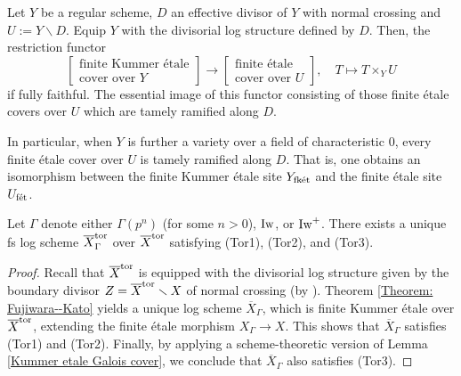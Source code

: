 \begin{Theorem}\label{Theorem: Fujiwara--Kato}
Let $Y$ be a regular scheme, $D$ an effective divisor of $Y$ with normal crossing and $U := Y \smallsetminus D$. Equip $Y$ with the divisorial log structure defined by $D$. Then, the restriction functor \[
    \left[\begin{array}{c}
        \text{finite Kummer \'etale}  \\
        \text{cover over $Y$} 
    \end{array}\right] \rightarrow \left[\begin{array}{c}
        \text{finite \'etale}  \\
         \text{cover over $U$}
    \end{array}\right], \quad T \mapsto T\times_Y U
\] if fully faithful. The essential image of this functor consisting of those finite \'etale covers over $U$ which are tamely ramified along $D$.
\end{Theorem}

In particular, when $Y$ is further a variety over a field of characteristic $0$, every finite \'etale cover over $U$ is tamely ramified along $D$. That is, one obtains an isomorphism between the finite Kummer \'etale site $Y_{\operatorname{\textrm{fk\'{e}t}}}$ and the finite \'etale site $U_{\operatorname{\textrm{f\'{e}t}}}$.

\begin{Proposition}\label{Proposition: toridal compactification of algebraic Siegel varieties}
Let $\Gamma$ denote either $\Gamma(p^n)$ (for some $n>0$), $\operatorname{Iw}$, or $\operatorname{Iw}^+$. There exists a unique fs log scheme $\overline{X}^{\operatorname{tor}}_{\Gamma}$ over $\overline{X}^{\operatorname{tor}}$ satisfying (Tor1),  (Tor2), and (Tor3).
\end{Proposition}
\begin{proof}
Recall that $\overline{X}^{\operatorname{tor}}$ is equipped with the divisorial log structure given by the boundary divisor 
$Z = \overline{X}^{\operatorname{tor}}\smallsetminus X$ of normal crossing (by \cite[Chapter IV, Theorem 6.7 (1)]{Faltings-Chai}). Theorem \ref{Theorem: Fujiwara--Kato} yields a unique log scheme $\overline{X}_{\Gamma}$, which is finite Kummer \'etale over $\overline{X}^{\operatorname{tor}}$, extending the finite \'etale morphism $X_{\Gamma} \rightarrow X$. This shows that $\overline{X}_{\Gamma}$ satisfies (Tor1) and (Tor2). Finally, by applying a scheme-theoretic version of Lemma \ref{Kummer etale Galois cover}, we conclude that $\overline{X}_{\Gamma}$ also satisfies (Tor3). 
\end{proof}

